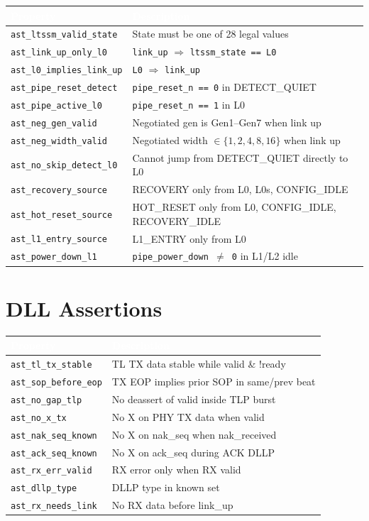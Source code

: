 \documentclass[12pt,a4paper]{report}
\newcommand{\theadcell}[1]{%
  \cellcolor{tablehead}\textcolor{white}{\textbf{#1}}}
\begin{document}
\begin{longtable}{lp{10cm}}
  \toprule
  \theadcell{Property} & \theadcell{Description} \\
  \midrule
  \endhead
  \texttt{ast\_ltssm\_valid\_state} & State must be one of 28 legal values \\
  \texttt{ast\_link\_up\_only\_l0}  & \texttt{link\_up} $\Rightarrow$ \texttt{ltssm\_state == L0} \\
  \texttt{ast\_l0\_implies\_link\_up}& \texttt{L0} $\Rightarrow$ \texttt{link\_up} \\
  \texttt{ast\_pipe\_reset\_detect} & \texttt{pipe\_reset\_n == 0} in DETECT\_QUIET \\
  \texttt{ast\_pipe\_active\_l0}    & \texttt{pipe\_reset\_n == 1} in L0 \\
  \texttt{ast\_neg\_gen\_valid}     & Negotiated gen is Gen1--Gen7 when link up \\
  \texttt{ast\_neg\_width\_valid}   & Negotiated width $\in \{1,2,4,8,16\}$ when link up \\
  \texttt{ast\_no\_skip\_detect\_l0}& Cannot jump from DETECT\_QUIET directly to L0 \\
  \texttt{ast\_recovery\_source}    & RECOVERY only from L0, L0s, CONFIG\_IDLE \\
  \texttt{ast\_hot\_reset\_source}  & HOT\_RESET only from L0, CONFIG\_IDLE, RECOVERY\_IDLE \\
  \texttt{ast\_l1\_entry\_source}   & L1\_ENTRY only from L0 \\
  \texttt{ast\_power\_down\_l1}     & \texttt{pipe\_power\_down $\neq$ 0} in L1/L2 idle \\
  \bottomrule
\end{longtable}

\section{DLL Assertions}

\begin{longtable}{lp{10cm}}
  \toprule
  \theadcell{Property} & \theadcell{Description} \\
  \midrule
  \endhead
  \texttt{ast\_tl\_tx\_stable}    & TL TX data stable while valid \& !ready \\
  \texttt{ast\_sop\_before\_eop}  & TX EOP implies prior SOP in same/prev beat \\
  \texttt{ast\_no\_gap\_tlp}      & No deassert of valid inside TLP burst \\
  \texttt{ast\_no\_x\_tx}         & No X on PHY TX data when valid \\
  \texttt{ast\_nak\_seq\_known}   & No X on nak\_seq when nak\_received \\
  \texttt{ast\_ack\_seq\_known}   & No X on ack\_seq during ACK DLLP \\
  \texttt{ast\_rx\_err\_valid}    & RX error only when RX valid \\
  \texttt{ast\_dllp\_type}        & DLLP type in known set \\
  \texttt{ast\_rx\_needs\_link}   & No RX data before link\_up \\
  \bottomrule
\end{longtable}
\end{document}
